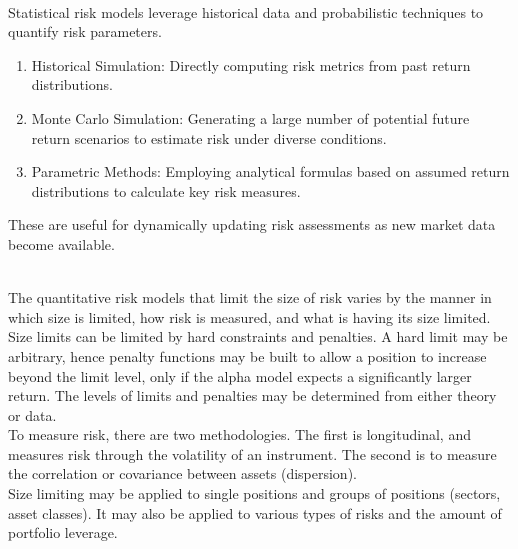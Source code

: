 \documentclass[a4paper,oneside,openany]{book}
\begin{document}
\begin{method} \\
Statistical risk models leverage historical data and probabilistic techniques to quantify risk parameters.
\begin{enumerate}[label=\roman*.]
\setlength{\itemsep}{0pt}
\item Historical Simulation: Directly computing risk metrics from past return distributions.
\item Monte Carlo Simulation: Generating a large number of potential future return scenarios to estimate risk under diverse conditions.
\item Parametric Methods: Employing analytical formulas based on assumed return distributions to calculate key risk measures.
\end{enumerate}
These are useful for dynamically updating risk assessments as new market data become available.
\end{method}

\begin{method} \\
The quantitative risk models that limit the size of risk varies by the manner in which size is limited, how risk is measured, and what is having its size limited.\\
Size limits can be limited by hard constraints and penalties. A hard limit may be arbitrary, hence penalty functions may be built to allow a position to increase beyond the limit level, only if the alpha model expects a significantly larger return. The levels of limits and penalties may be determined from either theory or data.\\
To measure risk, there are two methodologies. The first is longitudinal, and measures risk through the volatility of an instrument. The second is to measure the correlation or covariance between assets (dispersion).\\
Size limiting may be applied to single positions and groups of positions (sectors, asset classes). It may also be applied to various types of risks and the amount of portfolio leverage.
\end{method}
\end{document}
